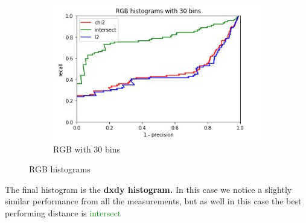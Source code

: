 \documentclass[
	12pt, %
]{fphw}
\begin{document}
\begin{figure}[h!]
\begin{subfigure}[b]{0.3\textwidth}
         \includegraphics[width=\textwidth]{img/plots/RGB_30.JPG}
         \caption{RGB with 30 bins}
         \label{fig:five over x}
     \end{subfigure}
        \caption{RGB histograms}
        \label{fig:three graphs}
\end{figure}\newpage
The final histogram is the \textbf{dxdy histogram.} In this case we notice a slightly similar performance from all the measurements, but as well in this case the best performing distance is \textcolor{ForestGreen}{intersect} 
\end{document}
